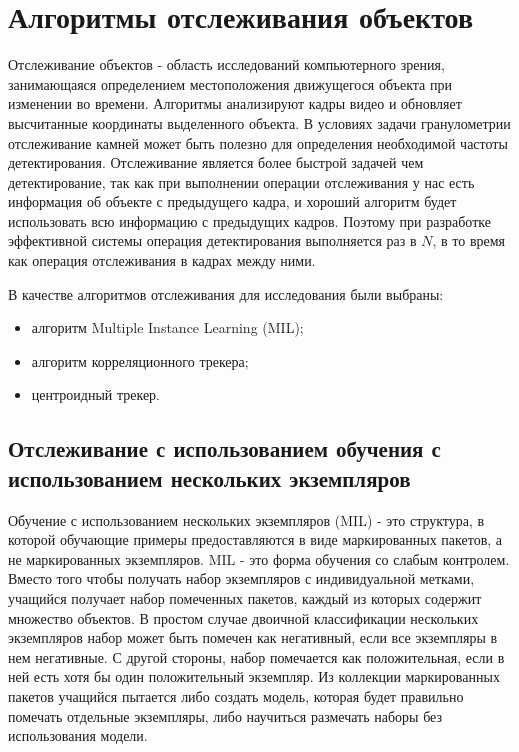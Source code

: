 \documentclass[times]{itmo-student-thesis}
\begin{document}
\chapter{Алгоритмы отслеживания объектов}

Отслеживание объектов - область исследований компьютерного зрения, занимающаяся определением местоположения движущегося объекта при изменении во времени. Алгоритмы анализируют кадры видео и обновляет высчитанные координаты выделенного объекта. В условиях задачи гранулометрии отслеживание камней может быть полезно для определения необходимой частоты детектирования.  Отслеживание является более быстрой задачей чем детектирование, так как при выполнении операции отслеживания у нас есть информация об объекте с предыдущего кадра, и хороший алгоритм будет использовать всю информацию с предыдущих кадров. Поэтому при разработке эффективной системы операция детектирования выполняется раз в $N$, в то время как операция отслеживания в кадрах между ними. 

В качестве алгоритмов отслеживания для исследования были выбраны:
\begin{itemize}
	\item алгоритм  Multiple Instance Learning (MIL);
	\item алгоритм корреляционного трекера;
	\item центроидный трекер.
\end{itemize}

\section{Отслеживание с использованием обучения  с использованием  нескольких экземпляров}
Обучение  с использованием  нескольких экземпляров (MIL) - это структура, в которой обучающие примеры предоставляются в виде маркированных пакетов, а не маркированных экземпляров. 
MIL - это форма обучения со слабым контролем.  Вместо того чтобы получать набор экземпляров с индивидуальной метками, учащийся получает набор помеченных пакетов, каждый из которых содержит множество объектов. В простом случае двоичной классификации нескольких экземпляров набор может быть помечен как негативный, если все экземпляры в нем негативные. С другой стороны, набор помечается как положительная, если в ней есть хотя бы один положительный экземпляр. Из коллекции маркированных пакетов учащийся пытается либо создать модель, которая будет правильно помечать отдельные экземпляры, либо  научиться размечать наборы без использования модели.  
\end{document}
